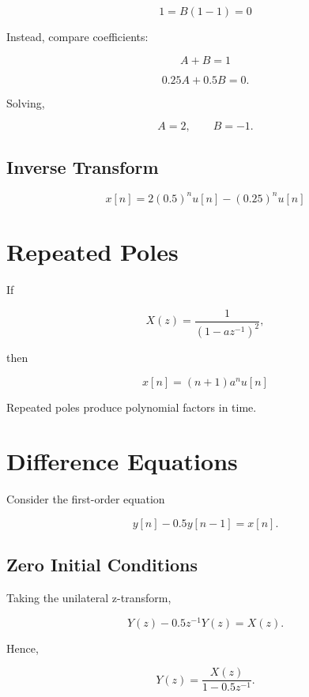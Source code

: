 \[
1=B(1-1)=0
\]

Instead, compare coefficients:

\[
A+B=1
\]

\[
0.25A+0.5B=0.
\]

Solving,

\[
A=2,
\qquad
B=-1.
\]


\subsection{Inverse Transform}

\[
\boxed{
x[n]=
2(0.5)^n u[n]
-(0.25)^n u[n]
}
\]


\section{Repeated Poles}

If

\[
X(z)=
\frac{1}{(1-az^{-1})^2},
\]

then

\[
\boxed{
x[n]=(n+1)a^n u[n]
}
\]

Repeated poles produce polynomial factors in time.


\section{Difference Equations}

Consider the first-order equation

\[
y[n]-0.5y[n-1]=x[n].
\]


\subsection{Zero Initial Conditions}

Taking the unilateral z-transform,

\[
Y(z)-0.5z^{-1}Y(z)=X(z).
\]

Hence,

\[
Y(z)=
\frac{X(z)}{1-0.5z^{-1}}.
\]

